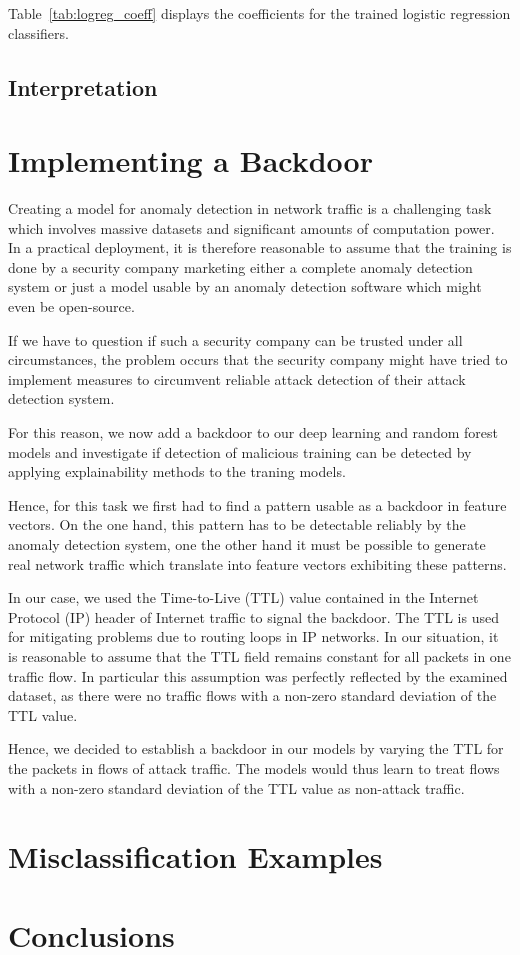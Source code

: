 \documentclass[sigconf,nonacm]{acmart}
\begin{document}
 Table~\ref{tab:logreg_coeff} displays the coefficients for the trained logistic regression classifiers.
\subsection{Interpretation}
\section{Implementing a Backdoor}
Creating a model for anomaly detection in network traffic is a challenging task which involves massive datasets and significant amounts of computation power. In a practical deployment, it is therefore reasonable to assume that the training is done by a security company marketing either a complete anomaly detection system or just a model usable by an anomaly detection software which might even be open-source.

If we have to question if such a security company can be trusted under all circumstances, the problem occurs that the security company might have tried to implement measures to circumvent reliable attack detection of their attack detection system. 

For this reason, we now add a backdoor to our deep learning and random forest models and investigate if detection of malicious training can be detected by applying explainability methods to the traning models.

Hence, for this task we first had to find a pattern usable as a backdoor in feature vectors. On the one hand, this pattern has to be detectable reliably by the anomaly detection system, one the other hand it must be possible to generate real network traffic which translate into feature vectors exhibiting these patterns.

In our case, we used the Time-to-Live (TTL) value contained in the Internet Protocol (IP) header of Internet traffic to signal the backdoor. The TTL is used for mitigating problems due to routing loops in IP networks. In our situation, it is reasonable to assume that the TTL field remains constant for all packets in one traffic flow. In particular this assumption was perfectly reflected by the examined dataset, as there were no traffic flows with a non-zero standard deviation of the TTL value.

Hence, we decided to establish a backdoor in our models by varying the TTL for the packets in flows of attack traffic.  The models would thus learn to treat flows with a non-zero standard deviation of the TTL value as non-attack traffic.

\section{Misclassification Examples}

\section{Conclusions}



\end{document}
